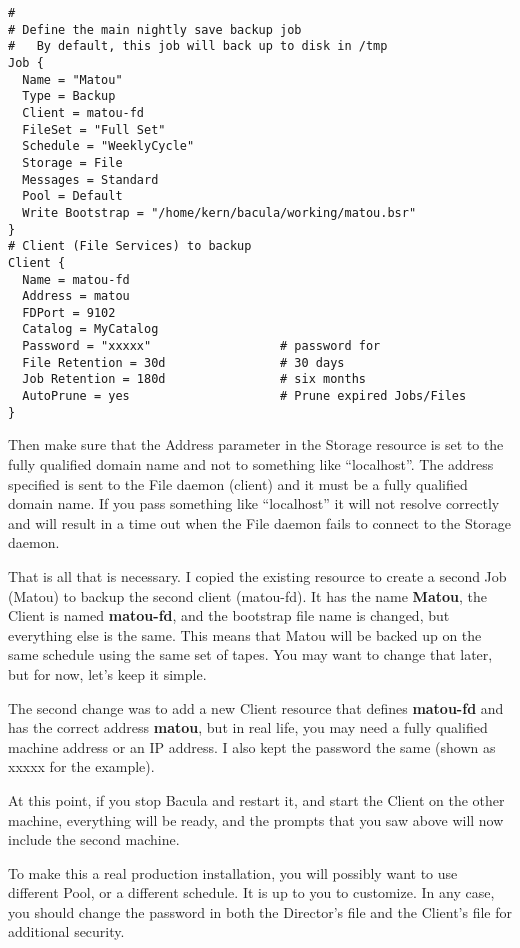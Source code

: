 {{\footnotesize
\begin{verbatim}
#
# Define the main nightly save backup job
#   By default, this job will back up to disk in /tmp
Job {
  Name = "Matou"
  Type = Backup
  Client = matou-fd
  FileSet = "Full Set"
  Schedule = "WeeklyCycle"
  Storage = File
  Messages = Standard
  Pool = Default
  Write Bootstrap = "/home/kern/bacula/working/matou.bsr"
}
# Client (File Services) to backup
Client {
  Name = matou-fd
  Address = matou
  FDPort = 9102
  Catalog = MyCatalog
  Password = "xxxxx"                  # password for
  File Retention = 30d                # 30 days
  Job Retention = 180d                # six months
  AutoPrune = yes                     # Prune expired Jobs/Files
}
\end{verbatim}
\normalsize

Then make sure that the Address parameter in the Storage resource is set to
the fully qualified domain name and not to something like ``localhost''. The
address specified is sent to the File daemon (client) and it must be a fully
qualified domain name. If you pass something like ``localhost'' it will not
resolve correctly and will result in a time out when the File daemon fails to
connect to the Storage daemon. 

That is all that is necessary. I copied the existing resource to create a
second Job (Matou) to backup the second client (matou-fd). It has the name
{\bf Matou}, the Client is named {\bf matou-fd}, and the bootstrap file name
is changed, but everything else is the same. This means that Matou will be
backed up on the same schedule using the same set of tapes. You may want to
change that later, but for now, let's keep it simple. 

The second change was to add a new Client resource that defines {\bf matou-fd}
and has the correct address {\bf matou}, but in real life, you may need a
fully qualified machine address or an IP address. I also kept the password the
same (shown as xxxxx for the example). 

At this point, if you stop Bacula and restart it, and start the Client on the
other machine, everything will be ready, and the prompts that you saw above
will now include the second machine. 

To make this a real production installation, you will possibly want to use
different Pool, or a different schedule. It is up to you to customize. In any
case, you should change the password in both the Director's file and the
Client's file for additional security. 

}}
